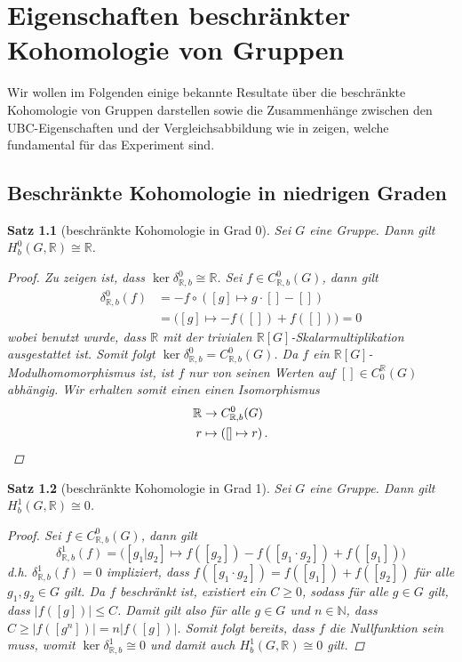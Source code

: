 \documentclass[a4paper,twoside,10pt]{scrreprt}
\newcommand{\N}{\mathbb{N}}
\newcommand{\R}{\mathbb{R}}
\newtheorem{satz}{Satz}[section]
\theoremstyle{definition}
\begin{document}
\chapter{Eigenschaften beschränkter Kohomologie von Gruppen}
Wir wollen im Folgenden einige bekannte Resultate über die beschränkte Kohomologie von Gruppen darstellen sowie die Zusammenhänge zwischen den $\text{UBC}$-Eigenschaften und der Vergleichsabbildung wie in \cite[Theorem 2.8]{matsumoto} zeigen, welche fundamental für das Experiment sind.
\section{Beschränkte Kohomologie in niedrigen Graden}\label{sec:BoundedCohomInLowDeg}
\begin{satz}[beschränkte Kohomologie in Grad 0]
Sei $G$ eine Gruppe. Dann gilt $H_b^0(G,\R)\cong \R$.
\begin{proof}
Zu zeigen ist, dass $\ker \delta_{\R,b}^0\cong \R$. Sei $f\in C_{\R,b}^0(G)$, dann gilt
\begin{align*}
\delta_{\R,b}^0(f)&=-f\circ \left([g]\mapsto g\cdot[]-[]\right)\\
&=\bigl([g]\mapsto -f\left([]\right)+f\left([]\right)\bigr)=0
\end{align*}
wobei benutzt wurde, dass $\R$ mit der trivialen $\R[G]$-Skalarmultiplikation ausgestattet ist. Somit folgt $\ker \delta_{\R,b}^0=C_{\R,b}^0(G)$.
Da $f$ ein $\R[G]$-Modulhomomorphismus ist, ist $f$ nur von seinen Werten auf $[]\in C_0^{\R}(G)$ abhängig. Wir erhalten somit einen einen Isomorphismus
\begin{align*}
\R&\to C_{\R,b}^0(G)\\
r&\mapsto \left([]\mapsto r\right).\qedhere
\end{align*} 
\end{proof}
\end{satz}
\begin{satz}[beschränkte Kohomologie in Grad 1]
Sei $G$ eine Gruppe. Dann gilt $H_b^1(G,\R)\cong 0$.
\begin{proof}
Sei $f\in C_{\R,b}^0(G)$, dann gilt
\begin{equation*}
\delta_{\R,b}^1(f)=\biggl([g_1|g_2]\mapsto f\left([g_2]\right)-f\left([g_1\cdot g_2]\right)+f\left([g_1]\right)\biggr)
\end{equation*}
d.h. $\delta_{\R,b}^1(f)=0$ impliziert, dass $f([g_1\cdot g_2])=f([g_1])+f([g_2])$ für alle $g_1,g_2\in G$ gilt.
Da $f$ beschränkt ist, existiert ein $C\geq 0$, sodass für alle $g\in G$ gilt, dass $|f([g])|\leq C$.
Damit gilt also für alle $g\in G$ und $n\in \N$, dass $C\geq|f([g^n])|=n|f([g])|$. Somit folgt bereits, dass $f$ die Nullfunktion sein muss, womit $\ker \delta_{\R,b}^1\cong 0$ und damit auch $H_b^1(G,\R)\cong 0$ gilt.
\end{proof}
\end{satz}
\end{document}
